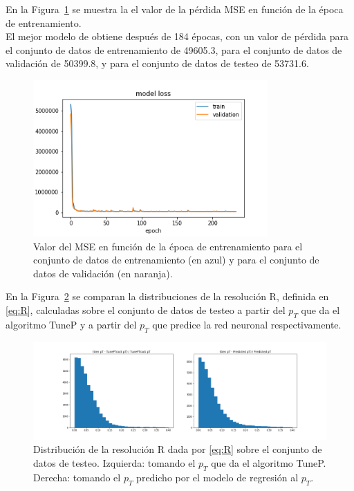 En la Figura~\ref{fig:model_loss} se muestra la el valor de la p\'erdida MSE en funci\'on de la \'epoca de entrenamiento. \\

El mejor modelo de obtiene despu\'es de 184 \'epocas, con un valor de p\'erdida para el conjunto de datos de entrenamiento de 49605.3, para el conjunto de datos de validaci\'on de 50399.8, y para el conjunto de datos de testeo de 53731.6.  \\

\begin{figure}[h]
\centering
\includegraphics[width=0.8\textwidth]{figures/model_loss.png}
\caption{Valor del MSE en funci\'on de la \'epoca de entrenamiento para el conjunto de datos de entrenamiento (en azul) y para el conjunto de datos de validaci\'on (en naranja).}
\label{fig:model_loss}        
\end{figure}


En la Figura~\ref{fig:R_predicted} se comparan la distribuciones de la resoluci\'on R, definida en \eqref{eq:R}, calculadas sobre el conjunto de datos de testeo a partir del $p_{T}$ que da el algoritmo TuneP y a partir del $p_{T}$ que predice la red neuronal respectivamente. \\

\begin{figure}[h]
\centering
\includegraphics[width=1.1\textwidth]{figures/R_predicted.png}
\caption{Distribuci\'on de la resoluci\'on R dada por \eqref{eq:R} sobre el conjunto de datos de testeo. Izquierda: tomando el $p_{T}$ que da el algoritmo TuneP. Derecha: tomando el $p_{T}$ predicho por el modelo de regresi\'on al $p_{T}$.}
\label{fig:R_predicted}        
\end{figure}

